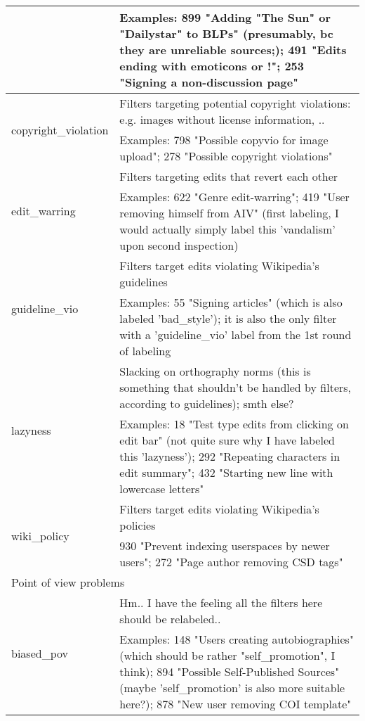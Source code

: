 \begin{longtable}{ | p{5cm} | p{9cm} | }
                                     & Examples: 899 "Adding "The Sun" or "Dailystar" to BLPs" (presumably, bc they are unreliable sources;); 491 "Edits ending with emoticons or !"; 253 "Signing a non-discussion page"\\
    \hline
    \multirow{2}{*}{copyright\_violation} & Filters targeting potential copyright violations: e.g. images without license information, ..\\
                                     & Examples: 798 "Possible copyvio for image upload"; 278 "Possible copyright violations"\\
    \hline
    \multirow{2}{*}{edit\_warring} & Filters targeting edits that revert each other \\
                                     & Examples: 622 "Genre edit-warring"; 419 "User removing himself from AIV" (first labeling, I would actually simply label this 'vandalism' upon second inspection)\\
    \hline
    \multirow{2}{*}{guideline\_vio} &  Filters target edits violating Wikipedia's guidelines \\%
                                     & Examples: 55 "Signing articles" (which is also labeled 'bad\_style'); it is also the only filter with a 'guideline\_vio' label from the 1st round of labeling\\
    \hline
    \multirow{2}{*}{lazyness} & Slacking on orthography norms (this is something that shouldn't be handled by filters, according to guidelines); smth else?\\
                                     & Examples: 18 "Test type edits from clicking on edit bar" (not quite sure why I have labeled this 'lazyness'); 292 "Repeating characters in edit summary"; 432 "Starting new line with lowercase letters"\\
    \hline
    \multirow{2}{*}{wiki\_policy} & Filters target edits violating Wikipedia's policies\\
                                     & 930 "Prevent indexing userspaces by newer users"; 272 "Page author removing CSD tags"\\
    \hline \hline
        \multicolumn{2}{|l|}{Point of view problems} \\
    \hline
    \multirow{2}{*}{biased\_pov} & Hm.. I have the feeling all the filters here should be relabeled..\\
                                     & Examples: 148 "Users creating autobiographies" (which should be rather "self\_promotion", I think); 894 "Possible Self-Published Sources" (maybe 'self\_promotion' is also more suitable here?); 878 "New user removing COI template"\\

\end{longtable}
